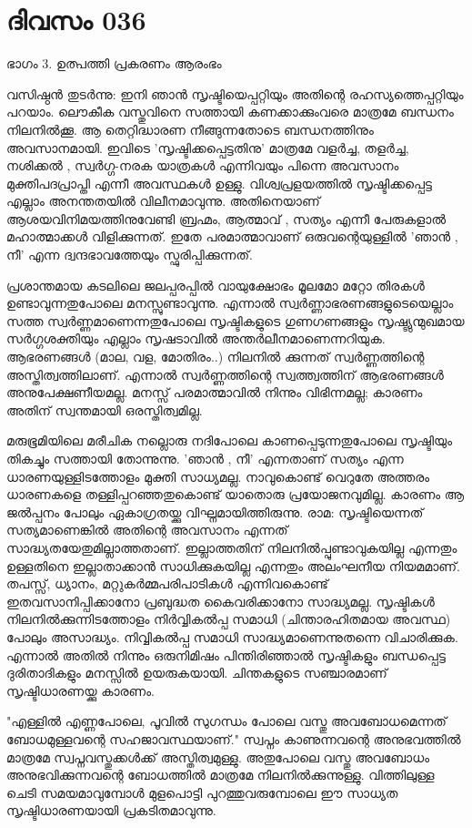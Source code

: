 \newpage
\section{ദിവസം 036}

ഭാഗം 3. ഉത്പത്തി പ്രകരണം ആരംഭം 


വസിഷ്ഠന്‍ തുടര്‍ന്നു: ഇനി ഞാന്‍ സൃഷ്ടിയെപ്പറ്റിയും അതിന്റെ രഹസ്യത്തെപ്പറ്റിയും പറയാം. ലൌകീക വസ്തുവിനെ സത്തായി കണക്കാക്കുംവരെ മാത്രമേ ബന്ധനം നിലനില്‍ക്കൂ. ആ തെറ്റിദ്ധാരണ നീങ്ങുന്നതോടെ ബന്ധനത്തിനും അവസാനമായി. ഇവിടെ 'സൃഷ്ടിക്കപ്പെട്ടതിനു' മാത്രമേ വളര്‍ച്ച, തളര്‍ച്ച, നശിക്കല്‍ , സ്വര്‍ഗ്ഗ-നരക യാത്രകള്‍ എന്നിവയും പിന്നെ അവസാനം മുക്തിപദപ്രാപ്തി എന്നീ അവസ്ഥകള്‍ ഉള്ളു. വിശ്വപ്രളയത്തില്‍ സൃഷ്ടിക്കപ്പെട്ട എല്ലാം അനന്തതയില്‍ വിലീനമാവുന്നു. അതിനെയാണ്‌ ആശയവിനിമയത്തിനുവേണ്ടി ബ്രഹ്മം, ആത്മാവ്   , സത്യം എന്നീ പേരുകളാല്‍ മഹാത്മാക്കള്‍ വിളിക്കുന്നത്‌. ഇതേ പരമാത്മാവാണ്‌ ഒരുവന്റെയുള്ളില്‍ 'ഞാന്‍ , നീ' എന്ന ദ്വന്ദഭാവത്തേയും സ്ഫുരിപ്പിക്കുന്നത്‌. 

പ്രശാന്തമായ കടലിലെ ജലപ്പരപ്പില്‍ വായുക്ഷോഭം മൂലമോ മറ്റോ തിരകള്‍ ഉണ്ടാവുന്നതുപോലെ മനസ്സുണ്ടാവുന്നു. എന്നാല്‍ സ്വര്‍ണ്ണാഭരണങ്ങളുടെയെല്ലാം സത്ത സ്വര്‍ണ്ണമാണെന്നതുപോലെ സൃഷ്ടികളുടെ ഗുണഗണങ്ങളും സൃഷ്ട്യുന്മുഖമായ സര്‍ഗ്ഗശക്തിയും എല്ലാം സൃഷടാവില്‍ അന്തര്‍ലീനമാണെന്നറിയുക. ആഭരണങ്ങള്‍ (മാല, വള, മോതിരം..) നിലനില്‍ ക്കുന്നത്‌ സ്വര്‍ണ്ണത്തിന്റെ അസ്തിത്വത്തിലാണ്‌. എന്നാല്‍ സ്വര്‍ണ്ണത്തിന്റെ സ്വത്ത്വത്തിന്‌ ആഭരണങ്ങള്‍ അനുപേക്ഷണീയമല്ല. മനസ്സ്‌ പരമാത്മാവില്‍ നിന്നും വിഭിന്നമല്ല; കാരണം അതിന്‌ സ്വന്തമായി ഒരസ്തിത്വമില്ല. 

മരുഭൂമിയിലെ മരീചിക നല്ലൊരു നദിപോലെ കാണപ്പെടുന്നതുപോലെ സൃഷ്ടിയും തികച്ചും സത്തായി തോന്നുന്നു. 'ഞാന്‍ , നീ' എന്നതാണ്‌ സത്യം എന്ന ധാരണയുള്ളിടത്തോളം മുക്തി സാധ്യമല്ല. നാവുകൊണ്ട്‌ വെറുതേ അത്തരം ധാരണകളെ തള്ളിപ്പറഞ്ഞതുകൊണ്ട്‌ യാതൊരു പ്രയോജനവുമില്ല. കാരണം ആ ജല്‍പ്പനം പോലും ഏകാഗ്രതയ്ക്കു വിഘ്നമായിത്തിരുന്നു. രാമ: സൃഷ്ടിയെന്നത്‌ സത്യമാണെങ്കില്‍ അതിന്റെ അവസാനം എന്നത്‌ സാദ്ധ്യതയേതുമില്ലാത്തതാണ്‌. ഇല്ലാത്തതിന്‌ നിലനില്‍പ്പുണ്ടാവുകയില്ല എന്നതും ഉള്ളതിനെ ഇല്ലാതാക്കാന്‍ സാധിക്കുകയില്ല എന്നതും അലംഘനീയ നിയമമാണ്‌. തപസ്സ്‌, ധ്യാനം, മറ്റുകര്‍മ്മപരിപാടികള്‍ എന്നിവകൊണ്ട്‌ ഇതവസാനിപ്പിക്കാനോ പ്രബുദ്ധത കൈവരിക്കാനോ സാദ്ധ്യമല്ല. സൃഷ്ടികള്‍ നിലനില്‍ക്കുന്നിടത്തോളം നിര്‍വ്വികല്‍പ്പ സമാധി (ചിന്താരഹിതമായ അവസ്ഥ) പോലും അസാദ്ധ്യം. നിവ്വികല്‍പ്പ സമാധി സാദ്ധ്യമാണെന്നുതന്നെ വിചാരിക്കുക. എന്നാല്‍ അതില്‍ നിന്നും ഒരുനിമിഷം പിന്തിരിഞ്ഞാല്‍ സൃഷ്ടികളും ബന്ധപ്പെട്ട ദുരിതാദികളും മനസ്സില്‍ ഉയരുകയായി. ചിന്തകളുടെ സഞ്ചാരമാണ്‌ സൃഷ്ടിധാരണയ്ക്കു കാരണം. 

"എള്ളില്‍ എണ്ണപോലെ, പൂവില്‍ സുഗന്ധം പോലെ വസ്തു അവബോധമെന്നത്‌ ബോധമുള്ളവന്റെ സഹജാവസ്ഥയാണ്‌." സ്വപ്നം കാണുന്നവന്റെ അനുഭവത്തില്‍ മാത്രമേ സ്വപ്നവസ്തുക്കള്‍ക്ക്‌ അസ്തിത്വമുള്ളു. അതുപോലെ വസ്തു അവബോധം അനുഭവിക്കുന്നവന്റെ ബോധത്തില്‍ മാത്രമേ നിലനില്‍ക്കുന്നുള്ളു. വിത്തിലുള്ള ചെടി സമയമാവുമ്പോള്‍ മുളപൊട്ടി പുറത്തുവരുമ്പോലെ ഈ സാധ്യത സൃഷ്ടിധാരണയായി പ്രകടിതമാവുന്നു. 
